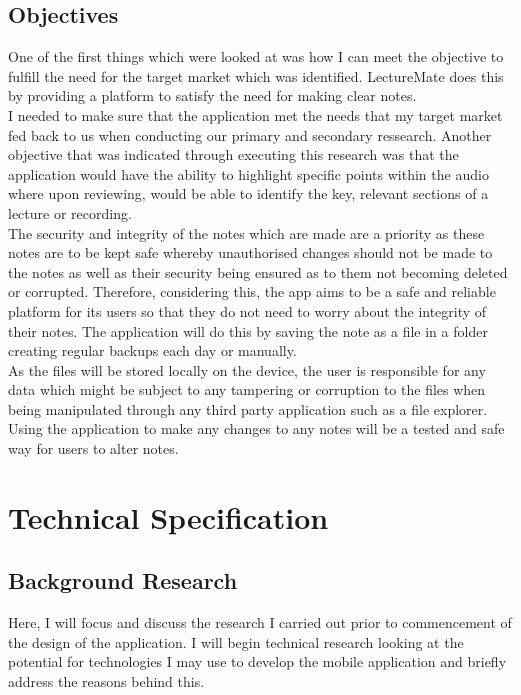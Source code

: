 \documentclass[oneside]{report}
\begin{document}
	\section{Objectives}
One of the first things which were looked at was how I can meet the objective to fulfill the need for the target market which was identified. LectureMate does this by providing a platform to satisfy the need for making clear notes.\\

I needed to make sure that the application met the needs that my target market fed back to us when conducting our primary and secondary ressearch. Another objective that was indicated through executing this research was that the application would have the ability to highlight specific points within the audio where upon reviewing, would be able to identify the key, relevant sections of a lecture or recording.\\

The security and integrity of the notes which are made are a priority as these notes are to be kept safe whereby unauthorised changes should not be made to the notes as well as their security being ensured as to them not becoming deleted or corrupted. Therefore, considering this, the app aims to be a safe and reliable platform for its users so that they do not need to worry about the integrity of their notes. The application will do this by saving the note as a file in a folder creating regular backups each day or manually.\\

As the files will be stored locally on the device, the user is responsible for any data which might be subject to any tampering or corruption to the files when being manipulated through any third party application such as a file explorer. Using the application to make any changes to any notes will be a tested and safe way for users to alter notes.

\chapter{Technical Specification}
	\section{Background Research}
	Here, I will focus and discuss the research I carried out prior to commencement of the design of the application. I will begin technical research looking at the potential for technologies I may use to develop the mobile application and briefly address the reasons behind this.
\end{document}
